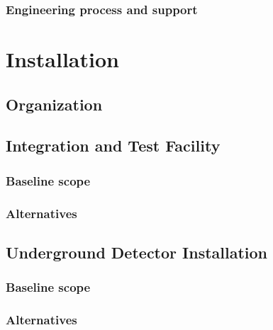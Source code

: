 \subsubsection{Engineering process and support}
\label{sec:fdsp-coord-integ-engr-proc}
 
  
\section{Installation}
\label{sec:fdsp-coord-install}

\subsection{Organization}
\label{sec:fdsp-coord-org}


\subsection{Integration and Test Facility}
\label{sec:fdsp-coord-integ-test}

\subsubsection{Baseline scope}
\label{sec:fdsp-coord-integ-test-base}

\subsubsection{Alternatives}
\label{sec:fdsp-coord-integ-test-alt}



\subsection{Underground Detector Installation}
\label{sec:fdsp-coord-undergd}


\subsubsection{Baseline scope}
\label{sec:fdsp-coord-undergd-base}


\subsubsection{Alternatives}
\label{sec:fdsp-coord-undergd-alt}

